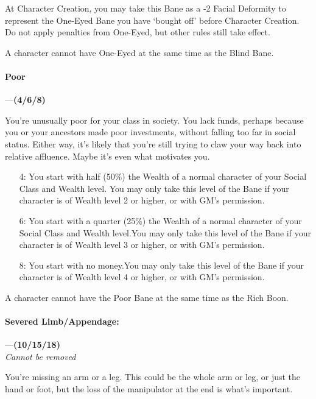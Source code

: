 \documentclass[oneside,11pt,english]{book}
\begin{document}
At Character Creation, you may take this Bane as a -2 Facial Deformity to
represent the One-Eyed Bane you have ‘bought off’ before Character Creation. Do
not apply penalties from One-Eyed, but other rules still take effect. 

A character cannot have One-Eyed at the same time as the Blind Bane.
\paragraph{\label{bane:Poor}Poor}---\quad\textbf{(4/6/8) }\par
You're unusually poor for your class in society. You lack funds, perhaps because
you or your ancestors made poor investments, without falling too far in social
status. Either way, it's likely that you're still trying to claw your way back
into relative affluence. Maybe it's even what motivates you. 

\begin{itemize}
\item [4:] You start with half (50\%) the Wealth of a normal character of your
  Social Class and Wealth level. You may only take this level of the Bane if
  your character is of Wealth level 2 or higher, or with GM's permission. 
\item [6:] You start with a quarter (25\%) the Wealth of a normal character of
  your Social Class and Wealth level.You may only take this level of the Bane if
  your character is of Wealth level 3 or higher, or with GM's permission. 
\item [8:] You start with no money.You may only take this level of the Bane if
  your character is of Wealth level 4 or higher, or with GM's permission. 
\end{itemize}
A character cannot have the Poor Bane at the same time as the Rich Boon.
\paragraph{\label{bane:Severed Limb/Appendage}Severed Limb/Appendage:}---\quad\textbf{(10/15/18) }\\
\emph{Cannot be removed}\par
You're missing an arm or a leg. This could be the whole arm or leg, or just the hand or foot, but the loss of the manipulator at the end is what's important.
\end{document}
